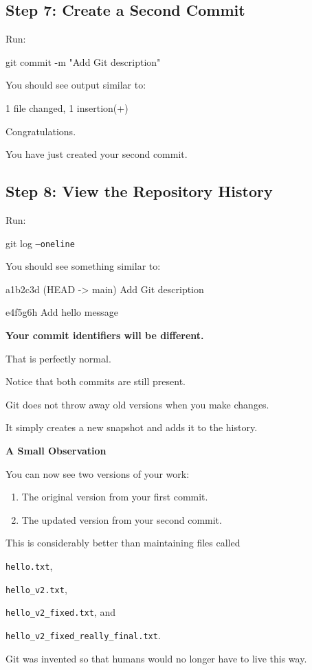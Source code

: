 \documentclass{csc2059practical}
\begin{document}
\subsection{Step 7: Create a Second Commit}
Run:

\begin{terminalplain}
git commit -m "Add Git description"
\end{terminalplain}
You should see output similar to:

\begin{terminalplain}
1 file changed, 1 insertion(+)
\end{terminalplain}
Congratulations.

You have just created your second commit.

\subsection{Step 8: View the Repository History}
Run:

\begin{terminalplain}
git log \texttt{--oneline}
\end{terminalplain}
You should see something similar to:

\begin{terminalplain}
a1b2c3d (HEAD -> main) Add Git description

e4f5g6h Add hello message
\end{terminalplain}

\textbf{Your commit identifiers will be different.}

That is perfectly normal.

Notice that both commits are still present.

Git does not throw away old versions when you make changes.

It simply creates a new snapshot and adds it to the history.

\begin{tipbox}
\textbf{A Small Observation}\par
\medskip
You can now see two versions of your work:
\begin{enumerate}
  \item The original version from your first commit.
  \item The updated version from your second commit.
\end{enumerate}
This is considerably better than maintaining files called 

\texttt{hello.txt},

\texttt{hello\_v2.txt}, 

\texttt{hello\_v2\_fixed.txt}, and 

\texttt{hello\_v2\_fixed\_really\_final.txt}.

Git was invented so that humans would no longer have to live this way.
\end{tipbox}
\end{document}
